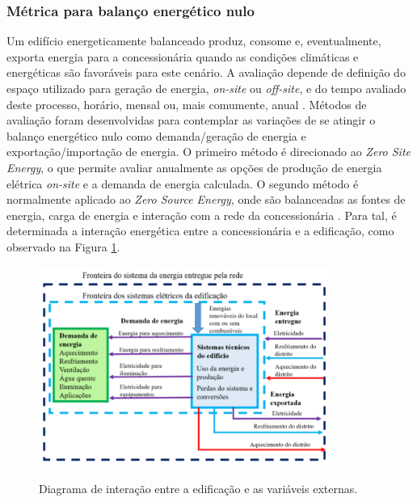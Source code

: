 \subsubsection{Métrica para balanço energético nulo}
Um edifício energeticamente balanceado produz, consome e, eventualmente, exporta energia 
para a concessionária quando as condições climáticas e energéticas são favoráveis para 
este cenário. A avaliação depende de definição do espaço utilizado para geração de energia, 
\textit{on-site} ou \textit{off-site}, e do tempo avaliado deste processo, horário, 
mensal ou, mais comumente, anual \cite{AmericanSocietyofHeatingRefrigeratingandAir-ConditioningEngineers-ASHRAE2019}.\newline
Métodos de avaliação foram desenvolvidas para contemplar as variações de se atingir o 
balanço energético nulo como demanda/geração de energia e exportação/importação de energia. 
O primeiro método é direcionado ao \textit{Zero Site Energy}, o que permite avaliar 
anualmente as opções de produção de energia elétrica \textit{on-site} e a demanda de 
energia calculada. O segundo método é normalmente aplicado ao \textit{Zero Source Energy}, 
onde são balanceadas as fontes de energia, carga de energia e interação com a rede da 
concessionária \cite{Didone2014a}.\newline
Para tal, é determinada a interação energética entre a concessionária e a edificação, 
como observado na Figura \ref{Figura 1}.\pagebreak
\begin{figure}[h]
    \centering
    \caption{\small Diagrama de interação entre a edificação e as variáveis externas.}
    \includegraphics[width=0.85\textwidth]{figures/esquema_kurnitski _2011.png}
    \label{Figura 1}
\end{figure}

